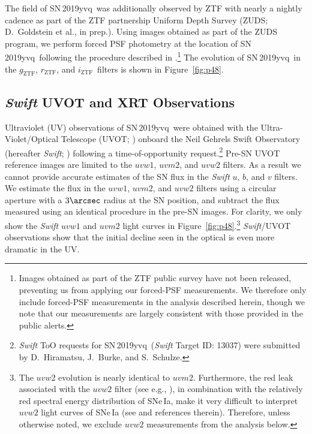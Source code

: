 \documentclass[twocolumn]{aastex63}
\newcommand{\rztf}{$r_\mathrm{ZTF}$}
\newcommand{\gztf}{$g_\mathrm{ZTF}$}
\newcommand{\iztf}{$i_\mathrm{ZTF}$}
\newcommand{\sn}{SN\,2019yvq}
\begin{document}
The field of \sn\ was additionally observed by ZTF with nearly a nightly
cadence as part of the ZTF partnership Uniform Depth Survey (ZUDS;
D.~Goldstein et al., in prep.). Using images obtained as part of the ZUDS
program, we perform forced PSF photometry at the location of \sn\ following
the procedure described in \citet{Yao19}.\footnote{Images obtained as part of
the ZTF public survey have not been released, preventing us from applying our
forced-PSF measurements. We therefore only include forced-PSF measurements in
the analysis described herein, though we note that our measurements are
largely consistent with those provided in the public alerts.} The evolution
of \sn\ in the \gztf, \rztf, and \iztf\ filters is shown in
Figure~\ref{fig:p48}.



\subsection{\textit{Swift} UVOT and XRT Observations}\label{sec:swift}

Ultraviolet (UV) observations of \sn\ were obtained with the
Ultra-Violet/Optical Telescope (UVOT; \citealt{Roming05}) onboard the Neil
Gehrels Swift Observatory (hereafter \textit{Swift}; \citealt{Gehrels04})
following a time-of-opportunity request.\footnote{\textit{Swift} ToO requests
for \sn\ (\textit{Swift} Target ID: 13037) were submitted by
D.~Hiramatsu, J.~Burke, and S.~Schulze.} Pre-SN UVOT reference images are
limited to the $uvw1$, $uvm2$, and $uvw2$ filters. As a result we cannot
provide accurate estimates of the SN flux in the \textit{Swift} $u$, $b$, and
$v$ filters. We estimate the flux in the $uvw1$, $uvm2$, and $uvw2$ filters
using a circular aperture with a $3\arcsec$ radius at the SN position, and
subtract the flux measured using an identical procedure in the pre-SN images.
For clarity, we only show the \textit{Swift} $uvw1$ and $uvm2$ light curves in
Figure~\ref{fig:p48}.\footnote{The $uvw2$ evolution is nearly identical to
$uvm2$. Furthermore, the red leak associated with the $uvw2$ filter (see e.g.,
\citealt{Breeveld11}), in combination with the relatively red spectral energy
distribution of SNe\,Ia, make it very difficult to interpret $uvw2$ light
curves of SNe\,Ia (see \citealt{Brown17} and references therein). Therefore,
unless otherwise noted, we exclude $uvw2$ measurements from the analysis
below.} \textit{Swift}/UVOT observations show that the initial decline seen in
the optical is even more dramatic in the UV.
\end{document}
